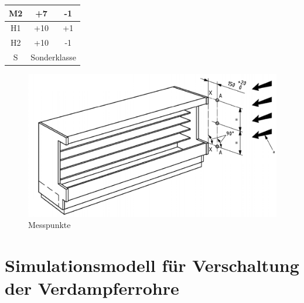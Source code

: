 \begin{table}[h!]
\begin{tabular}{|c|c|c|}
M2              & +7                                                                                                                         & -1                                                                                                                         \\ \hline
H1              & +10                                                                                                                        & +1                                                                                                                         \\ \hline
H2              & +10                                                                                                                        & -1                                                                                                                         \\ \hline
S               & \multicolumn{2}{c|}{Sonderklasse}                                                                                                                                                                                                                       \\ \hline
\end{tabular}
\end{table}




\begin{figure}[h!tb]
\centering
\includegraphics[scale=.5]{Pictures/idc_meas.pdf}
\caption{Messpunkte~\cite{DINDeutschesInstitutfurNormunge.V..}}
\label{fig:Messpunkte}
\end{figure}


\section{Simulationsmodell für Verschaltung der Verdampferrohre}
\label{sec:Simulationsmodell}

